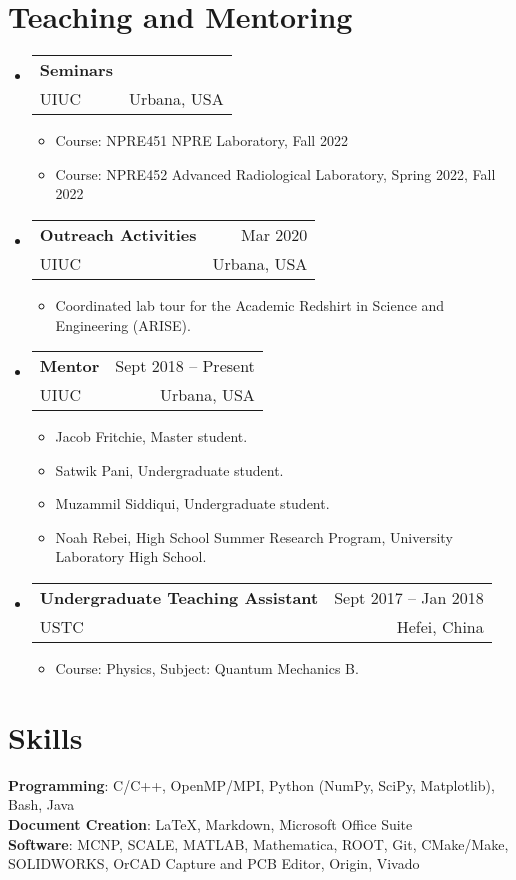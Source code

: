 \documentclass[letterpaper,11pt]{article} %
\makeatletter
\newcommand{\CVItem}[1]{
  \item\small{
    {#1 \vspace{-2pt}}
  }
}
\newcommand{\CVSubheading}[4]{
  \vspace{-2pt}\item
    \begin{tabular*}{0.97\textwidth}[t]{l@{\extracolsep{\fill}}r}
      \textbf{#1} & #2 \\
      \small#3 & \small #4 \\
    \end{tabular*}\vspace{-7pt}
}
\newcommand{\CVSubHeadingListStart}{\begin{itemize}[leftmargin=0.5cm, label={}]}
\newcommand{\CVSubHeadingListEnd}{\end{itemize}}
\newcommand{\CVItemListStart}{\begin{itemize}}
\newcommand{\CVItemListEnd}{\end{itemize}\vspace{-5pt}}
\makeatother
\begin{document}
\begin{comment}
Section is here as it applied to my application for positions in academia. 
Remember to tailor the resume for to the position.
\end{comment}

\section{Teaching and Mentoring}
\CVSubHeadingListStart
    \CVSubheading
      {Seminars}{}
      {UIUC}{Urbana, USA}
      \CVItemListStart
        \CVItem{Course: NPRE451 NPRE Laboratory, Fall 2022}
        \CVItem{Course: NPRE452 Advanced Radiological Laboratory, Spring 2022, Fall 2022}
      \CVItemListEnd
    \CVSubheading
      {Outreach Activities}{Mar 2020}
      {UIUC}{Urbana, USA}
      \CVItemListStart
        \CVItem{Coordinated lab tour for the Academic Redshirt in Science and Engineering (ARISE).}
      \CVItemListEnd
    \newpage
    \CVSubheading
      {Mentor}{Sept 2018 – Present}
      {UIUC}{Urbana, USA}
      \CVItemListStart
        \CVItem{Jacob Fritchie, Master student.}
        \CVItem{Satwik Pani, Undergraduate student.}
        \CVItem{Muzammil Siddiqui, Undergraduate student.}
        \CVItem{Noah Rebei, High School Summer Research Program, University Laboratory High School.}
      \CVItemListEnd
    \CVSubheading
      {Undergraduate Teaching Assistant}{Sept 2017 – Jan 2018}
      {USTC}{Hefei, China}
      \CVItemListStart
        \CVItem{Course: Physics, Subject: Quantum Mechanics B.}
      \CVItemListEnd
  \CVSubHeadingListEnd

\begin{comment}
This section is compressed from the various skills sections that Euro CV
recommends.
\end{comment}

\section{Skills}
 \begin{itemize}[leftmargin=0.5cm, label={}]
    {\item{
     \textbf{Programming}{: C/C++, OpenMP/MPI, Python (NumPy, SciPy, Matplotlib), Bash, Java} \\
     \textbf{Document Creation}{: \LaTeX, Markdown, Microsoft Office Suite} \\
     \textbf{Software}{: MCNP, SCALE, MATLAB, Mathematica, ROOT, Git, CMake/Make, SOLIDWORKS, OrCAD Capture and PCB Editor, Origin, Vivado}\\
    }}
 \end{itemize}
\end{document}
